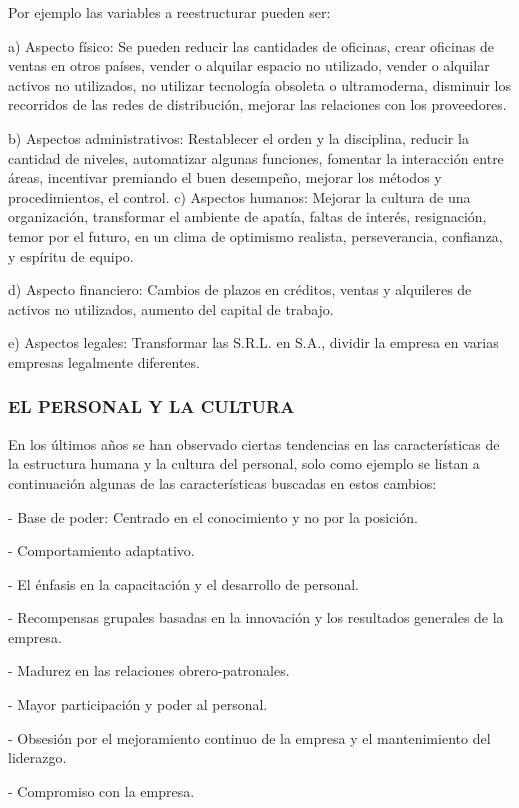 
Por ejemplo las variables a reestructurar pueden ser:

a) Aspecto físico: Se pueden reducir las cantidades de oficinas, crear oficinas de ventas en otros países, vender o alquilar espacio no utilizado, vender o alquilar activos no utilizados, no utilizar tecnología obsoleta o ultramoderna, disminuir los recorridos de las redes de distribución, mejorar las relaciones con los proveedores.

b) Aspectos administrativos: Restablecer el orden y la disciplina, reducir la cantidad de niveles, automatizar algunas funciones, fomentar la interacción entre áreas, incentivar premiando el buen desempeño, mejorar los métodos y procedimientos, el control. c) Aspectos humanos: Mejorar la cultura de una organización, transformar el ambiente de apatía, faltas de interés, resignación, temor por el futuro, en un clima de optimismo realista, perseverancia, confianza, y espíritu de equipo.

d) Aspecto financiero: Cambios de plazos en créditos, ventas y alquileres de activos no utilizados, aumento del capital de trabajo.

e) Aspectos legales: Transformar las S.R.L. en S.A., dividir la empresa en varias empresas legalmente diferentes.

\subsubsection*{EL PERSONAL Y LA CULTURA}
En los últimos años se han observado ciertas tendencias en las características de la estructura humana y la cultura del personal, solo como ejemplo se listan a continuación algunas de las características buscadas en estos cambios:

- Base de poder: Centrado en el conocimiento y no por la posición.

- Comportamiento adaptativo.

- El énfasis en la capacitación y el desarrollo de personal.

- Recompensas grupales basadas en la innovación y los resultados generales de la empresa.

- Madurez en las relaciones obrero-patronales.

- Mayor participación y poder al personal.

- Obsesión por el mejoramiento continuo de la empresa y el mantenimiento del liderazgo.

- Compromiso con la empresa.

